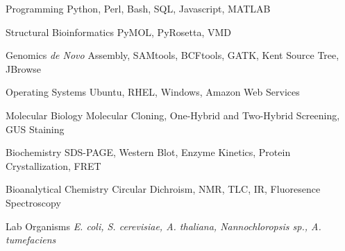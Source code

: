 

\begin{cvskills}

  \cvskill
    {Programming} %
    {Python, Perl, Bash, SQL, Javascript, MATLAB} %

  \cvskill
    {Structural Bioinformatics} %
    {PyMOL, PyRosetta, VMD} %

  \cvskill
    {Genomics} %
    {\textit{de Novo} Assembly, SAMtools, BCFtools, GATK, Kent Source Tree, JBrowse} %

  \cvskill
    {Operating Systems} %
    {Ubuntu, RHEL, Windows, Amazon Web Services} %

  \cvskill
    {Molecular Biology} %
    {Molecular Cloning, One-Hybrid and Two-Hybrid Screening, GUS Staining} %

  \cvskill
    {Biochemistry} %
    {SDS-PAGE, Western Blot, Enzyme Kinetics, Protein Crystallization, FRET} %

  \cvskill
    {Bioanalytical Chemistry} %
    {Circular Dichroism, NMR, TLC, IR, Fluoresence Spectroscopy} %

  \cvskill
    {Lab Organisms} %
    {\textit{E. coli, S. cerevisiae, A. thaliana, Nannochloropsis sp., A. tumefaciens}} %
    
\vspace{-6.0mm}
\end{cvskills}